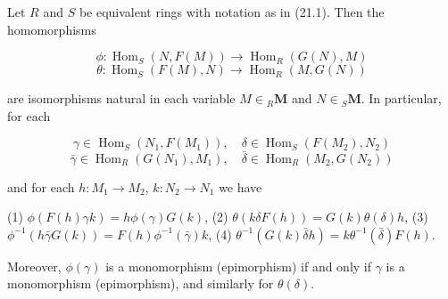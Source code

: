 Let $R$ and $S$ be equivalent rings with notation as in (21.1). Then the homomorphisms

$$\phi: \operatorname{Hom}_S(N, F(M)) \to \operatorname{Hom}_R(G(N), M)$$
$$\theta: \operatorname{Hom}_S(F(M), N) \to \operatorname{Hom}_R(M, G(N))$$

are isomorphisms natural in each variable $M \in {}_R \mathbf{M}$ and $N \in {}_S \mathbf{M}$. In particular, for each

$$\gamma \in \operatorname{Hom}_S(N_1, F(M_1)), \quad \delta \in \operatorname{Hom}_S(F(M_2), N_2)$$
$$\bar{\gamma} \in \operatorname{Hom}_R(G(N_1), M_1), \quad \bar{\delta} \in \operatorname{Hom}_R(M_2, G(N_2))$$

and for each $h: M_1 \to M_2$, $k: N_2 \to N_1$ we have

(1) $\phi(F(h)\gamma k) = h \phi(\gamma) G(k)$,
(2) $\theta(k \delta F(h)) = G(k) \theta(\delta) h$,
(3) $\phi^{-1}(h \bar{\gamma} G(k)) = F(h) \phi^{-1}(\bar{\gamma}) k$,
(4) $\theta^{-1}(G(k) \bar{\delta} h) = k \theta^{-1}(\bar{\delta}) F(h)$.

Moreover, $\phi(\gamma)$ is a monomorphism (epimorphism) if and only if $\gamma$ is a monomorphism (epimorphism), and similarly for $\theta(\delta)$.
